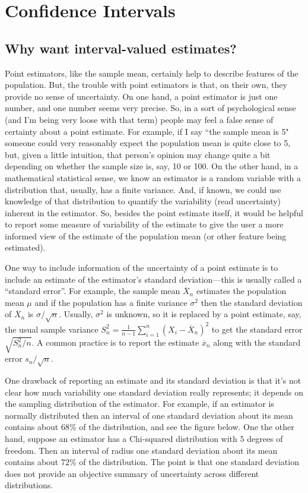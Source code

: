\documentclass[]{book}
\begin{document}
\chapter{Confidence Intervals}\label{confidence-intervals}

\section{Why want interval-valued
estimates?}\label{why-want-interval-valued-estimates}

Point estimators, like the sample mean, certainly help to describe
features of the population. But, the trouble with point estimators is
that, on their own, they provide no sense of uncertainty. On one hand, a
point estimator is just one number, and one number seems very precise.
So, in a sort of psychological sense (and I'm being very loose with that
term) people may feel a false sense of certainty about a point estimate.
For example, if I say ``the sample mean is 5" someone could very
reasonably expect the population mean is quite close to 5, but, given a
little intuition, that person's opinion may change quite a bit depending
on whether the sample size is, say, 10 or 100. On the other hand, in a
mathematical statistical sense, we know an estimator is a random
variable with a distribution that, usually, has a finite variance. And,
if known, we could use knowledge of that distribution to quantify the
variability (read uncertainty) inherent in the estimator. So, besides
the point estimate itself, it would be helpful to report some measure of
variability of the estimate to give the user a more informed view of the
estimate of the population mean (or other feature being estimated).

One way to include information of the uncertainty of a point estimate is
to include an estimate of the estimator's standard deviation---this is
usually called a ``standard error''. For example, the sample mean
\(\overline X_n\) estimates the population mean \(\mu\) and if the
population has a finite variance \(\sigma^2\) then the standard
deviation of \(\overline X_n\) is \(\sigma/\sqrt{n}\). Usually,
\(\sigma^2\) is unknown, so it is replaced by a point estimate, say, the
usual sample variance
\(S_n^2 = \frac{1}{n-1}\sum_{i=1}^n (X_i - \overline X_n)^2\) to get the
standard error \(\sqrt{S_n^2/n}\). A common practice is to report the
estimate \(\overline x_n\) along with the standard error
\(s_n/\sqrt{n}\).

One drawback of reporting an estimate and its standard deviation is that
it's not clear how much variability one standard deviation really
represents; it depends on the sampling distribution of the estimator.
For example, if an estimator is normally distributed then an interval of
one standard deviation about its mean contains about \(68\%\) of the
distribution, and see the figure below. One the other hand, suppose an
estimator has a Chi-squared distribution with \(5\) degrees of freedom.
Then an interval of radius one standard deviation about its mean
contains about \(72\%\) of the distribution. The point is that one
standard deviation does not provide an objective summary of uncertainty
across different distributions.
\end{document}
